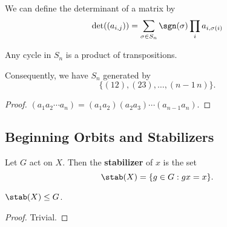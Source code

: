 \begin{ex}
We can define the determinant of a matrix by
\[ \det((a_{i,j})) = \sum_{\sigma \in S_n} \sgn(\sigma) \prod_{i}
a_{i,\sigma(i)} \]
\end{ex}

\begin{prop}
Any cycle in $S_n$ is a product of transpositions.

Consequently, we have $S_n$ generated by
\[ \lbrace (12), (23), \dots, (n - 1\,n) \rbrace. \]
\end{prop}

\begin{proof}
$(a_1 a_2 \cdots a_n) = (a_1 a_2)(a_2 a_3) \cdots (a_{n - 1}a_n)$.
\end{proof}

\subsection{Beginning Orbits and Stabilizers}
\begin{df}
Let $G$ act on $X$. Then the \textbf{stabilizer} of $x$ is the set
\[ \stab(X) = \lbrace g \in G : gx = x \rbrace. \]
\end{df}

\begin{prop}
$\stab(X) \leq G$.
\end{prop}

\begin{proof}
Trivial.
\end{proof}
